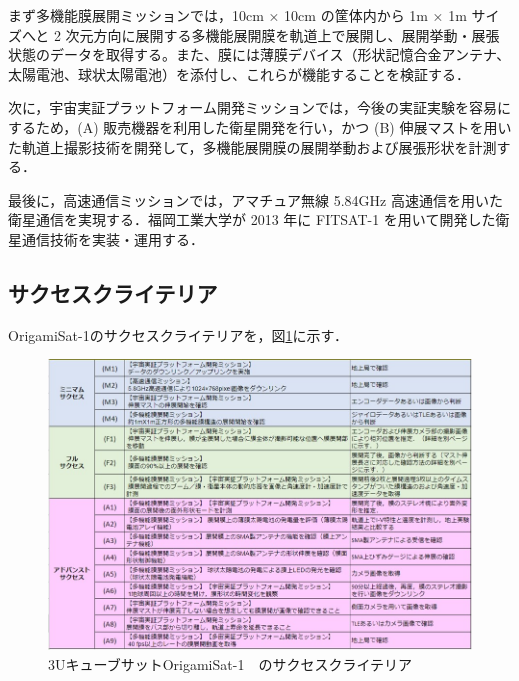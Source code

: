 まず多機能膜展開ミッションでは，10cm × 10cm の筐体内から 1m × 1m サイズへと 2 次元方向に展開する多機能展開膜を軌道上で展開し、展開挙動・展張状態のデータを取得する。また、膜には薄膜デバイス（形状記憶合金アンテナ、太陽電池、球状太陽電池）を添付し、これらが機能することを検証する．

次に，宇宙実証プラットフォーム開発ミッションでは，今後の実証実験を容易にするため，(A) 販売機器を利用した衛星開発を行い，かつ (B) 伸展マストを用いた軌道上撮影技術を開発して，多機能展開膜の展開挙動および展張形状を計測する．

最後に，高速通信ミッションでは，アマチュア無線 5.84GHz 高速通信を用いた衛星通信を実現する．福岡工業大学が 2013 年に FITSAT-1 を用いて開発した衛星通信技術を実装・運用する．

\subsection{サクセスクライテリア}

OrigamiSat-1のサクセスクライテリアを，図\ref{2-1-1}に示す．
\begin{figure}[H]
	\centering
	\includegraphics[width=\textwidth]{02/fig/2-1-1.jpg}
	\caption{3UキューブサットOrigamiSat-1　のサクセスクライテリア}
	\label{2-1-1}
\end{figure}

